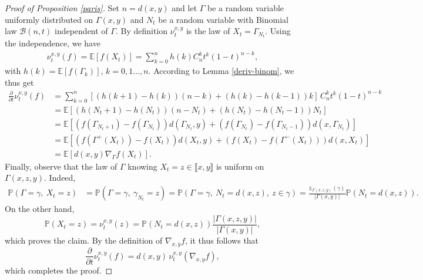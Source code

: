 \documentclass[11pt]{amsart}
\numberwithin{equation}{section}
\begin{document}
\begin{proof}[Proof of Proposition \ref{paris}]
Set $n=d(x,y)$ and let $\Gamma$ be a random variable uniformly distributed on $\Gamma(x,y)$ and $N_t$ be a random variable with Binomial law $\mathcal{B}(n,t)$ independent of $\Gamma$. By definition $\nu_t^{x,y}$ is the law of $X_t = \Gamma_{N_t}.$
Using the independence, we have
\begin{align*}
\nu_t^{x,y}(f)= {\mathbb{E}}\left[ f(X_t)\right] = \sum_{k=0}^n h(k) C^k_nt^k(1-t)^{n-k},
\end{align*}
with $h(k)={\mathbb{E}}[f(\Gamma_k)]$, $k=0,1\dots,n$.
According to Lemma \ref{deriv-binom}, we thus get
\begin{align*}
\frac{\partial}{\partial t}\nu_t^{x,y}(f)&= \sum_{k=0}^n \left[(h(k+1)-h(k))(n-k)+(h(k)-h(k-1))k\right]\,C_n^kt^k(1-t)^{n-k}\\
&={\mathbb{E}}\left[(h(N_t+1)-h(N_t))(n-N_t)+(h(N_t)-h(N_t-1))N_t \right]\\
&={\mathbb{E}}\left[(f(\Gamma_{N_t+1})-f(\Gamma_{N_t}))d(\Gamma_{N_t},y)+(f(\Gamma_{N_t})-f(\Gamma_{N_t-1}))d(x,\Gamma_{N_t}) \right]\\
&={\mathbb{E}}\left[(f(\Gamma^+(X_t))-f(X_t))d(X_t,y)+(f(X_t)-f(\Gamma^-(X_t)))d(x,X_t) \right] \\
&={\mathbb{E}}\left[d(x,y)\nabla_\Gamma f(X_t) \right].
\end{align*}
Finally, observe that the law of $\Gamma$ knowing $X_t=z\in \llbracket x,y\rrbracket$ is uniform on $\Gamma(x,z,y).$ Indeed,
\begin{align*}
{\mathbb{P}}(\Gamma =\gamma,\ X_t=z)&= {\mathbb{P}}(\Gamma = \gamma,\ \gamma_{N_t}=z) = {\mathbb{P}}(\Gamma = \gamma,\ N_t=d(x,z),\ z\in \gamma)
 = \frac{{\mathds{1}}_{\Gamma(x,z,y)}(\gamma)}{|\Gamma(x,y)|}{\mathbb{P}}(N_t=d(x,z)).
\end{align*}
On the other hand,
$${\mathbb{P}}(X_t=z)=\nu_t^{x,y}(z)={\mathbb{P}}(N_t=d(x,z)) \frac{|\Gamma(x,z,y)|}{|\Gamma(x,y)|},$$
which proves the claim. 
By the definition of $\nabla_{x,y}f$, it thus follows that
$$\frac{\partial}{\partial t}\nu_t^{x,y}(f) = d(x,y)\,\nu_t^{x,y} (\nabla_{x,y}f),$$
which completes the proof.
\end{proof}
\end{document}
